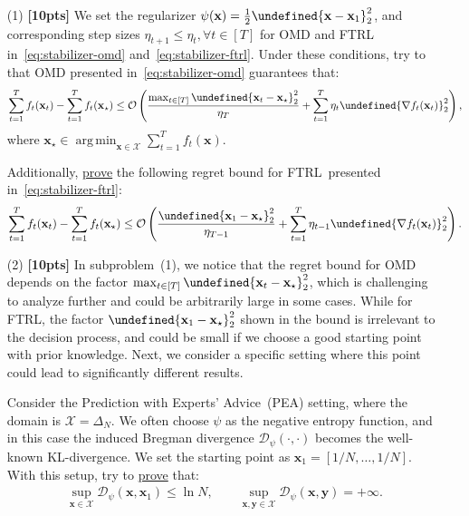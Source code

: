 \documentclass[a4paper]{article}
\numberwithin{equation}{section}
\theoremstyle{definition}
\DeclareMathOperator*{\argmin}{arg\,min}
\theoremstyle{definition}
\def \D {\mathcal{D}}
\def \X {\mathcal{X}}
\def \O {\mathcal{O}}
\def \x {\textbf{x}}
\def \xs {\x_\star}
\def \y {\textbf{y}}
\let\norm\undefined
\DeclarePairedDelimiter\norm{\lVert}{\rVert}
\begin{document}
\begin{enumerate}
  \item[(1)] \textbf{[10pts]} We set the regularizer $\psi(\x) = \frac{1}{2}\norm{\x - \x_1}_2^2$, and corresponding step sizes $\eta_{t+1} \leq \eta_{t}, \forall t\in[T]$ for OMD and FTRL in~\eqref{eq:stabilizer-omd} and~\eqref{eq:stabilizer-ftrl}. Under these conditions, try to  that OMD presented in~\eqref{eq:stabilizer-omd} guarantees that:
  \begin{align*}
    \sum_{t=1}^T f_t(\x_t)-\sum_{t=1}^T f_t(\xs) \leq \O\left(\frac{\max_{t \in [T]}\norm{\x_t-\xs}_2^2}{\eta_T}+ \sum_{t=1}^T \eta_{t}\norm{\nabla f_t(\x_t)}_2^2\right),
  \end{align*}
  where $\xs \in \argmin_{\x \in \X}\sum_{t=1}^T f_t(\x)$. 
  
  Additionally, \underline{prove} the following regret bound for FTRL~presented in~\eqref{eq:stabilizer-ftrl}:
  \begin{align*}
        \sum_{t=1}^T f_t(\x_t)-\sum_{t=1}^T f_t(\xs) \leq \O\left(\frac{\norm{\x_1-\xs}_2^2}{\eta_{T-1}}+ \sum_{t=1}^T \eta_{t-1}\norm{\nabla f_t(\x_t)}_2^2\right).
  \end{align*}

  \item[(2)] \textbf{[10pts]} In subproblem~(1), we notice that the regret bound for OMD depends on the factor $\max_{t \in [T]}\norm{\x_t-\xs}_2^2$, which is challenging to analyze further and could be arbitrarily large in some cases. While for FTRL, the factor $\norm{\x_1-\xs}_2^2$ shown in the bound is irrelevant to the decision process, and could be small if we choose a good starting point with prior knowledge. Next, we consider a specific setting where this point could lead to significantly different results.
  
  Consider the Prediction with Experts' Advice~(PEA) setting, where the domain is $\mathcal{X} = \Delta_N$. We often choose $\psi$ as the negative entropy function, and in this case the induced Bregman divergence $\D_{\psi}(\cdot, \cdot)$ becomes the well-known KL-divergence. We set the starting point as $\x_1 = \left[1/N, \ldots, 1/N\right]$. With this setup, try to \underline{prove} that:
  \begin{align*} 
    \sup_{\x \in \X} \D_{\psi}(\x, \x_1) \leq \ln N, \qquad \sup_{\x, \y \in \X} \D_{\psi}(\x, \y) = +\infty. 
  \end{align*}



\end{enumerate}
\end{document}
